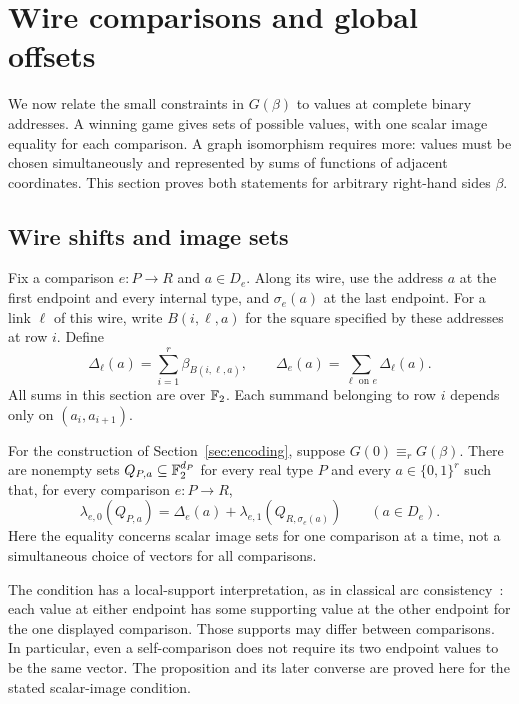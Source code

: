 \section{Wire comparisons and global offsets}
\label{sec:offsets}

We now relate the small constraints in $G(\beta)$ to values at complete
binary addresses. A winning game gives sets of possible values, with
one scalar image equality for each comparison. A graph isomorphism
requires more: values must be chosen simultaneously and represented
by sums of functions of adjacent coordinates. This section proves
both statements for arbitrary right-hand sides $\beta$.

\subsection{Wire shifts and image sets}

Fix a comparison $e:P\to R$ and $a\in D_e$. Along its wire, use
the address $a$ at the first endpoint and every internal type, and
$\sigma_e(a)$ at the last endpoint. For a link $\ell$ of this wire,
write $B(i,\ell,a)$ for the square specified by these addresses at
row $i$. Define
\begin{equation}
 \Delta_\ell(a)=\sum_{i=1}^r\beta_{B(i,\ell,a)},
 \qquad
 \Delta_e(a)=\sum_{\ell\text{ on }e}\Delta_\ell(a).
 \label{eq:wire-shift}
\end{equation}
All sums in this section are over $\mathbb F_2$. Each summand belonging to
row $i$ depends only on $(a_i,a_{i+1})$.

\begin{proposition}
\label{prop:image-consistency}
For the construction of Section~\ref{sec:encoding}, suppose
$G(0)\equiv_r G(\beta)$. There are nonempty sets
$Q_{P,a}\subseteq\mathbb F_2^{d_P}$ for every real type $P$ and every
$a\in\{0,1\}^r$ such that, for every comparison $e:P\to R$,
\begin{equation}
 \lambda_{e,0}(Q_{P,a})
   =\Delta_e(a)+\lambda_{e,1}(Q_{R,\sigma_e(a)})
 \qquad(a\in D_e).
 \label{eq:image-consistency}
\end{equation}
Here the equality concerns scalar image sets for one comparison at
a time, not a simultaneous choice of vectors for all comparisons.
\end{proposition}

The condition has a local-support interpretation, as in classical arc
consistency~\cite[Section~4]{Mackworth1977}: each value at either endpoint
has some supporting value at the other endpoint for the one displayed
comparison. Those supports may differ between comparisons. In
particular, even a self-comparison does not require its two endpoint
values to be the same vector. The proposition and its later converse
are proved here for the stated scalar-image condition.

